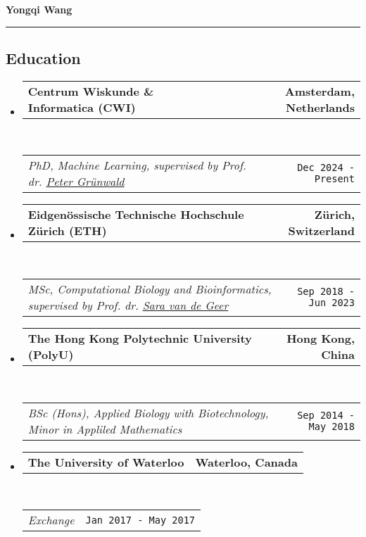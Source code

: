 \documentclass[10pt,a4paper]{article}
\makeatletter
\newcommand{\headerrow}[2]
{\begin{tabular*}{\linewidth}{l@{\extracolsep{\fill}}r}
	#1 &
	#2 \\
\end{tabular*}}
\newcommand{\urlPeter}{https://safestatistics.com/}
\newcommand{\urlSara}{https://stat.ethz.ch/~vsara/}
\makeatother
\begin{document}

\begin{center}
	{\LARGE \textbf{Yongqi Wang}}
\end{center}


\hrule
\vspace{-1em}
\subsection*{Education}

\begin{itemize}
	\parskip=0.1em

	\item
	      \headerrow
	      {\textbf{Centrum Wiskunde \& Informatica (CWI)}}
	      {\textbf{Amsterdam, Netherlands}}
	      \\
	      \headerrow
	      {\emph{PhD, Machine Learning, supervised by Prof. dr.
			      \href{\urlPeter}{Peter Grünwald}}}
	      {\texttt{Dec 2024 - Present}}

	\item
	      \headerrow
	      {\textbf{Eidgenössische Technische Hochschule Zürich (ETH)}}
	      {\textbf{Zürich, Switzerland}}
	      \\
	      \headerrow
	      {\emph{MSc, Computational Biology and Bioinformatics,
			      supervised by Prof. dr. \href{\urlSara}{Sara van de Geer}}}
	      {\texttt{Sep 2018 - Jun 2023}}

	\item
	      \headerrow
	      {\textbf{The Hong Kong Polytechnic University (PolyU)}}
	      {\textbf{Hong Kong, China}}
	      \\
	      \headerrow
	      {\emph{BSc (Hons), Applied Biology with Biotechnology,
			      Minor in Appliled Mathematics}}
	      {\texttt{Sep 2014 - May 2018}}

	\item
	      \headerrow
	      {\textbf{The University of Waterloo}}
	      {\textbf{Waterloo, Canada}}
	      \\
	      \headerrow
	      {\emph{Exchange}}
	      {\texttt{Jan 2017 - May 2017}}

\end{itemize}
\end{document}
